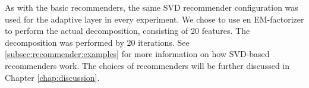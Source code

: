 As with the basic recommenders, the same SVD recommender configuration was used 
for the adaptive layer in every experiment.
We chose to use en EM-factorizer to perform the actual decomposition,
consisting of 20 features. The decomposition was performed by 20 iterations.
See \ref{subsec:recommender:examples} for more information on how SVD-based recommenders work. 
The choices of recommenders will be further discussed
in Chapter \ref{chap:discussion}.

